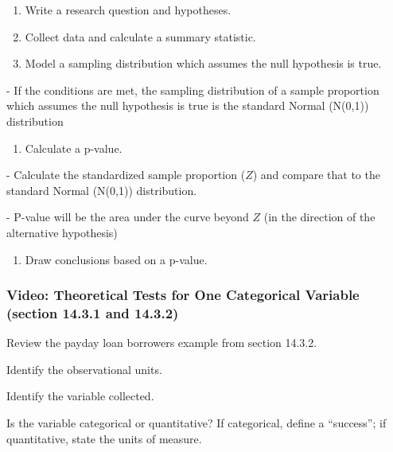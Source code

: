 \documentclass[
]{report}
\providecommand{\tightlist}{%
  \setlength{\itemsep}{0pt}\setlength{\parskip}{0pt}}
\newcommand{\rgi}{\hspace{24pt}}  %
\begin{document}
\begin{enumerate}
\def\labelenumi{\arabic{enumi}.}
\item
  Write a research question and hypotheses.
\item
  Collect data and calculate a summary statistic.
\item
  Model a sampling distribution which assumes the null hypothesis is true.
\end{enumerate}

\rgi \rgi - If the conditions are met, the sampling distribution of a sample proportion which assumes the null hypothesis is true is the standard Normal (N(0,1)) distribution

\begin{enumerate}
\def\labelenumi{\arabic{enumi}.}
\setcounter{enumi}{3}
\tightlist
\item
  Calculate a p-value.
\end{enumerate}

\rgi \rgi - Calculate the standardized sample proportion (\(Z\)) and compare that to the standard Normal (N(0,1)) distribution.

\rgi \rgi - P-value will be the area under the curve beyond \(Z\) (in the direction of the alternative hypothesis)

\begin{enumerate}
\def\labelenumi{\arabic{enumi}.}
\setcounter{enumi}{4}
\tightlist
\item
  Draw conclusions based on a p-value.
\end{enumerate}

\subsubsection*{Video: Theoretical Tests for One Categorical Variable (section 14.3.1 and 14.3.2)}\label{video-theoretical-tests-for-one-categorical-variable-section-14.3.1-and-14.3.2}

Review the payday loan borrowers example from section 14.3.2.

Identify the observational units.

\vspace{0.3in}

Identify the variable collected.

\vspace{0.3in}

Is the variable categorical or quantitative? If categorical, define a ``success''; if quantitative, state the units of measure.
\end{document}

